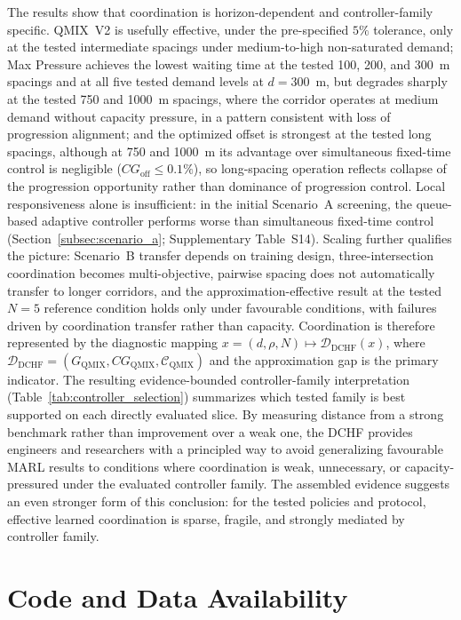 \documentclass[review,12pt]{elsarticle}
\begin{document}
The results show that coordination is horizon-dependent and controller-family specific. QMIX~V2 is usefully effective, under the pre-specified $5\%$ tolerance, only at the tested intermediate spacings under medium-to-high non-saturated demand; Max Pressure achieves the lowest waiting time at the tested 100, 200, and 300~m spacings and at all five tested demand levels at $d=300$~m, but degrades sharply at the tested 750 and 1000~m spacings, where the corridor operates at medium demand without capacity pressure, in a pattern consistent with loss of progression alignment; and the optimized offset is strongest at the tested long spacings, although at 750 and 1000~m its advantage over simultaneous fixed-time control is negligible ($CG_{\mathrm{off}}\leq0.1\%$), so long-spacing operation reflects collapse of the progression opportunity rather than dominance of progression control. Local responsiveness alone is insufficient: in the initial Scenario~A
screening, the queue-based adaptive controller performs worse than
simultaneous fixed-time control (Section~\ref{subsec:scenario_a}; Supplementary Table~S14). Scaling further qualifies the picture: Scenario~B transfer depends on training design, three-intersection coordination becomes multi-objective, pairwise spacing does not automatically transfer to longer corridors, and the approximation-effective result at the tested $N=5$ reference condition holds only under favourable conditions, with failures driven by coordination transfer rather than capacity. Coordination is therefore represented by the diagnostic mapping $x=(d,\rho,N)\mapsto\mathcal{D}_{\mathrm{DCHF}}(x)$, where $\mathcal{D}_{\mathrm{DCHF}}=(G_{\mathrm{QMIX}},CG_{\mathrm{QMIX}},\mathcal{C}_{\mathrm{QMIX}})$ and the approximation gap is the primary indicator. The resulting evidence-bounded controller-family interpretation (Table~\ref{tab:controller_selection}) summarizes which tested family is best supported on each directly evaluated slice. By measuring distance from a strong benchmark rather than improvement over a weak one, the DCHF provides engineers and researchers with a principled way to avoid generalizing favourable MARL results to conditions where coordination is weak, unnecessary, or capacity-pressured under the evaluated controller family. The assembled evidence suggests an even stronger form of this conclusion: for the tested policies and protocol, effective learned coordination is sparse, fragile, and strongly mediated by controller family.


\section*{Code and Data Availability}
\end{document}
